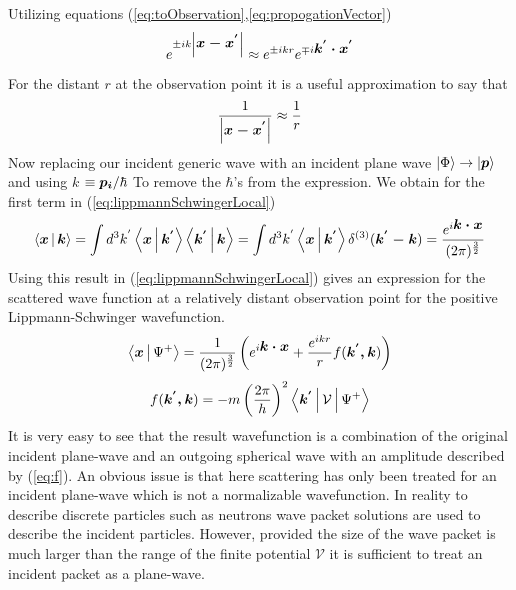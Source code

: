 Utilizing equations (\ref{eq:toObservation},\ref{eq:propogationVector}) 
\begin{equation}
e^{\pm ik \left|\mbox{\boldmath$x-x^{'}$}\right|} \approx e^{\pm ikr}e^{\mp i \mbox{\boldmath$k^{'}\cdot x^{'}$}}
\label{eq:waveSimplification}
\end{equation}
For the distant $r$ at the observation point it is a useful approximation to say that 
\begin{equation}
\frac{1}{\left|\mbox{\boldmath$x-x^{'}$}\right|} \approx \frac{1}{r}
\end{equation}
Now replacing our incident generic wave with an incident plane wave $\Ket{\Phi}\rightarrow \Ket{\mbox{\boldmath$p$}}$ and using \mbox{\boldmath$k$} $\equiv \mbox{\boldmath$p_i$}/ \hbar$ To remove the $\hbar$'s from the expression. We obtain for the first term in (\ref{eq:lippmannSchwingerLocal}) 
\begin{equation}
\Braket{\mbox{\boldmath$x$}|\mbox{\boldmath$k$}}=\int d^3k^{'} \Braket{\mbox{\boldmath$x$}|\mbox{\boldmath$k^{'}$}}\Braket{\mbox{\boldmath$k^{'}$}|\mbox{\boldmath$k$}}=\int d^3k^{'}  \Braket{\mbox{\boldmath$x$}|\mbox{\boldmath$k^{'}$}} \delta^{(3)}(\mbox{\boldmath$k^{'}-k$})=\frac{e^{i\mbox{\boldmath$k \cdot x$}}}{(2\pi)^{\frac{3}{2}}}
\label{eq:PlaneWave}
\end{equation}
Using this result in (\ref{eq:lippmannSchwingerLocal}) gives an expression for the scattered wave function at a relatively distant observation point for the positive Lippmann-Schwinger wavefunction. 
\begin{equation}
\label{eq:scatteredEquation}
\Braket{\mbox{\boldmath$x$}|\Psi^{+}} = \frac{1}{(2\pi)^{\frac{3}{2}}}\left(e^{i\mbox{\boldmath$k \cdot x$}} + \frac{e^{ikr}}{r}f(\mbox{\boldmath$k^{'},k$})\right)
\end{equation}
\begin{equation}
\label{eq:f}
f(\mbox{\boldmath$k^{'},k$})=-m\left(\frac{2\pi}{h}\right)^2\Braket{\mbox{\boldmath$k^{'}$}|\mathcal{V}|\Psi^{+}}
\end{equation}
It is very easy to see that the result wavefunction is a combination of the original incident plane-wave and an outgoing spherical wave with an amplitude described by (\ref{eq:f}). An obvious issue is that here scattering has only been treated for an incident plane-wave which is not a normalizable wavefunction. In reality to describe discrete particles such as neutrons wave packet solutions are used to describe the incident particles. However, provided the size of the wave packet is much larger than the range of the finite potential $\mathcal{V}$ it is sufficient to treat an incident packet as a plane-wave.  

